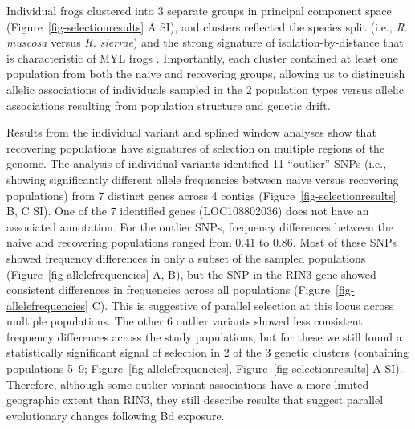 \documentclass[
  letterpaper,
  DIV=11,
  numbers=noendperiod]{scrartcl}
\begin{document}
Individual frogs clustered into 3 separate groups in principal component
space (Figure~\ref{fig-selectionresults} A SI), and clusters reflected
the species split (i.e., \emph{R. muscosa} versus \emph{R. sierrae}) and
the strong signature of isolation-by-distance that is characteristic of
MYL frogs \citep{rothstein2020, poorten2017, byrne2023}. Importantly,
each cluster contained at least one population from both the naive and
recovering groups, allowing us to distinguish allelic associations of
individuals sampled in the 2 population types versus allelic
associations resulting from population structure and genetic drift.

Results from the individual variant and splined window analyses show
that recovering populations have signatures of selection on multiple
regions of the genome. The analysis of individual variants identified 11
``outlier'' SNPs (i.e., showing significantly different allele
frequencies between naive versus recovering populations) from 7 distinct
genes across 4 contigs (Figure~\ref{fig-selectionresults} B, C SI). One
of the 7 identified genes (LOC108802036) does not have an associated
annotation. For the outlier SNPs, frequency differences between the
naive and recovering populations ranged from 0.41 to 0.86. Most of these
SNPs showed frequency differences in only a subset of the sampled
populations (Figure~\ref{fig-allelefrequencies} A, B), but the SNP in
the RIN3 gene showed consistent differences in frequencies across all
populations (Figure~\ref{fig-allelefrequencies} C). This is suggestive
of parallel selection at this locus across multiple populations. The
other 6 outlier variants showed less consistent frequency differences
across the study populations, but for these we still found a
statistically significant signal of selection in 2 of the 3 genetic
clusters (containing populations 5--9;
Figure~\ref{fig-allelefrequencies}, Figure~\ref{fig-selectionresults} A
SI). Therefore, although some outlier variant associations have a more
limited geographic extent than RIN3, they still describe results that
suggest parallel evolutionary changes following Bd exposure.
\end{document}

